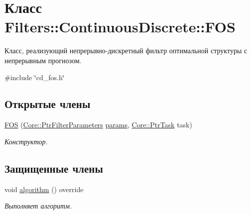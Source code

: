 \hypertarget{class_filters_1_1_continuous_discrete_1_1_f_o_s}{}\section{Класс Filters\+:\+:Continuous\+Discrete\+:\+:F\+OS}
\label{class_filters_1_1_continuous_discrete_1_1_f_o_s}


Класс, реализующий непрерывно-\/дискретный фильтр оптимальной структуры с непрерывным прогнозом.  




{\ttfamily \#include \char`\"{}cd\+\_\+fos.\+h\char`\"{}}

\subsection*{Открытые члены}
\begin{DoxyCompactItemize}
\item 
\hyperlink{class_filters_1_1_continuous_discrete_1_1_f_o_s_a969ba843b1c5df806d4eb1054d16f4f9}{F\+OS} (\hyperlink{namespace_core_a4811af8148ba137d644b9a61a042cf03}{Core\+::\+Ptr\+Filter\+Parameters} \hyperlink{class_core_1_1_filter_a44aa749b49ba46256975ce545531ecf7}{params}, \hyperlink{namespace_core_abfda8f69fcacfcea2696549b548ed737}{Core\+::\+Ptr\+Task} task)\hypertarget{class_filters_1_1_continuous_discrete_1_1_f_o_s_a969ba843b1c5df806d4eb1054d16f4f9}{}\label{class_filters_1_1_continuous_discrete_1_1_f_o_s_a969ba843b1c5df806d4eb1054d16f4f9}

\begin{DoxyCompactList}\small\item\em Конструктор. \end{DoxyCompactList}\end{DoxyCompactItemize}
\subsection*{Защищенные члены}
\begin{DoxyCompactItemize}
\item 
void \hyperlink{class_filters_1_1_continuous_discrete_1_1_f_o_s_a1e3d6f40678f13a33971bc7bceb45496}{algorithm} () override
\begin{DoxyCompactList}\small\item\em Выполняет алгоритм. \end{DoxyCompactList}\end{DoxyCompactItemize}
